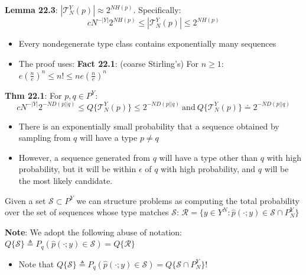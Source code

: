 \documentclass[12pt]{article} %
\begin{document}
\textbf{Lemma 22.3}: $|\mathcal{T}_N^Y(p)| \approx 2^{NH(p)}$. Specifically:
\begin{equation*}
    cN^{-|Y|}2^{NH(p)} \leq |\mathcal{T}_N^Y(p)| \leq 2^{NH(p)}
\end{equation*}
\begin{itemize}[topsep=-1pt, itemsep=-1pt]
    \item 
Every nondegenerate type class contains exponentially many sequences
    \item The proof uses: 
\textbf{Fact 22.1}: (coarse Stirling's) For $n \geq 1$: $e \left(\frac{n}{e}\right)^n \leq n! \leq n e \left(\frac{n}{e}\right)^n$
\end{itemize}


\textbf{Thm 22.1}: For $p,q \in P^Y$:
\begin{equation*}
    cN^{-|Y|}2^{-ND(p||q)} \leq Q\{ \mathcal{T}_N^Y(p) \}
    \leq 2^{-ND(p||q)} 
    \ \text{and} \
    Q\{ \mathcal{T}_N^Y(p) \} \doteq 2^{-ND(p||q)} 
\end{equation*}
\begin{itemize}[topsep=-1pt, itemsep=-1pt]
    \item 
There is an exponentially small probability that a sequence obtained by sampling from $q$ will have a type $p \neq q$
    \item 
However, a sequence generated from $q$ will have a type other than $q$ with high probability, but it will be within $\epsilon$ of $q$ with high probability, and $q$ will be the most likely candidate.
\end{itemize}

\separate
Given a set $\mathcal{S} \subset P^Y$ we can structure problems as computing the total probability over the set of sequences whose type matches $\mathcal{S}$: $\mathcal{R} = \{y \in Y^N : \hat{p}(\cdot; y) \in \mathcal{S} \cap P^Y_N\}$

\textbf{Note}: We adopt the following abuse of notation: $Q\{\mathcal{S}\} \triangleq P_q(\hat{p}(\cdot; y) \in \mathcal{S}) = Q\{\mathcal{R}\}$
\begin{itemize}[topsep=-1pt, itemsep=-1pt]
    \item 
Note that $Q\{\mathcal{S}\} \triangleq P_q(\hat{p}(\cdot; y) \in \mathcal{S}) = Q\{\mathcal{S} \cap P_N^Y\}$!
\end{itemize}
\end{document}
